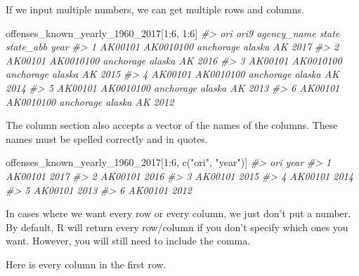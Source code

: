 \documentclass[
  12pt,
  openany]{book}
\newenvironment{Shaded}{\begin{snugshade}}{\end{snugshade}}
\newcommand{\CommentTok}[1]{\textcolor[rgb]{0.37,0.37,0.37}{\textit{#1}}}
\newcommand{\DecValTok}[1]{\textcolor[rgb]{0.06,0.06,0.06}{#1}}
\newcommand{\FunctionTok}[1]{\textcolor[rgb]{0,0,0}{#1}}
\newcommand{\NormalTok}[1]{#1}
\newcommand{\SpecialCharTok}[1]{\textcolor[rgb]{0,0,0}{#1}}
\newcommand{\StringTok}[1]{\textcolor[rgb]{0.5,0.5,0.5}{#1}}
\begin{document}
If we input multiple numbers, we can get multiple rows and columns.

\begin{Shaded}
\begin{Highlighting}[]
\NormalTok{offenses\_known\_yearly\_1960\_2017[}\DecValTok{1}\SpecialCharTok{:}\DecValTok{6}\NormalTok{, }\DecValTok{1}\SpecialCharTok{:}\DecValTok{6}\NormalTok{]}
\CommentTok{\#\textgreater{}       ori      ori9 agency\_name  state state\_abb year}
\CommentTok{\#\textgreater{} 1 AK00101 AK0010100   anchorage alaska        AK 2017}
\CommentTok{\#\textgreater{} 2 AK00101 AK0010100   anchorage alaska        AK 2016}
\CommentTok{\#\textgreater{} 3 AK00101 AK0010100   anchorage alaska        AK 2015}
\CommentTok{\#\textgreater{} 4 AK00101 AK0010100   anchorage alaska        AK 2014}
\CommentTok{\#\textgreater{} 5 AK00101 AK0010100   anchorage alaska        AK 2013}
\CommentTok{\#\textgreater{} 6 AK00101 AK0010100   anchorage alaska        AK 2012}
\end{Highlighting}
\end{Shaded}

The column section also accepts a vector of the names of the columns. These names must be spelled correctly and in quotes.

\begin{Shaded}
\begin{Highlighting}[]
\NormalTok{offenses\_known\_yearly\_1960\_2017[}\DecValTok{1}\SpecialCharTok{:}\DecValTok{6}\NormalTok{, }\FunctionTok{c}\NormalTok{(}\StringTok{"ori"}\NormalTok{, }\StringTok{"year"}\NormalTok{)]}
\CommentTok{\#\textgreater{}       ori year}
\CommentTok{\#\textgreater{} 1 AK00101 2017}
\CommentTok{\#\textgreater{} 2 AK00101 2016}
\CommentTok{\#\textgreater{} 3 AK00101 2015}
\CommentTok{\#\textgreater{} 4 AK00101 2014}
\CommentTok{\#\textgreater{} 5 AK00101 2013}
\CommentTok{\#\textgreater{} 6 AK00101 2012}
\end{Highlighting}
\end{Shaded}

In cases where we want every row or every column, we just don't put a number. By default, R will return every row/column if you don't specify which ones you want. However, you will still need to include the comma.

Here is every column in the first row.
\end{document}
